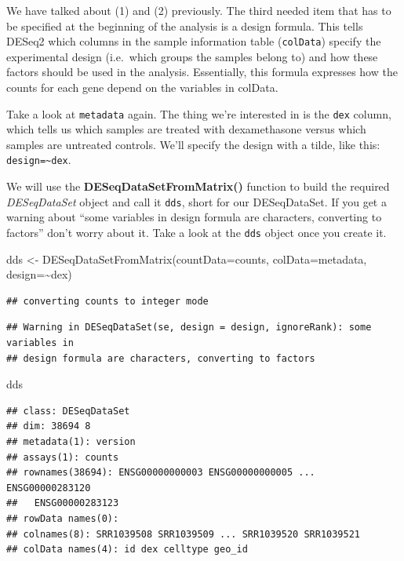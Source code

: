 \documentclass[
]{article}
\newenvironment{Shaded}{\begin{snugshade}}{\end{snugshade}}
\newcommand{\AttributeTok}[1]{\textcolor[rgb]{0.77,0.63,0.00}{#1}}
\newcommand{\FunctionTok}[1]{\textcolor[rgb]{0.00,0.00,0.00}{#1}}
\newcommand{\NormalTok}[1]{#1}
\newcommand{\OtherTok}[1]{\textcolor[rgb]{0.56,0.35,0.01}{#1}}
\newcommand{\SpecialCharTok}[1]{\textcolor[rgb]{0.00,0.00,0.00}{#1}}
\begin{document}
We have talked about (1) and (2) previously. The third needed item that
has to be specified at the beginning of the analysis is a design
formula. This tells DESeq2 which columns in the sample information table
(\texttt{colData}) specify the experimental design (i.e.~which groups
the samples belong to) and how these factors should be used in the
analysis. Essentially, this formula expresses how the counts for each
gene depend on the variables in colData.

Take a look at \texttt{metadata} again. The thing we're interested in is
the \texttt{dex} column, which tells us which samples are treated with
dexamethasone versus which samples are untreated controls. We'll specify
the design with a tilde, like this:
\texttt{design=\textasciitilde{}dex}.

We will use the \textbf{DESeqDataSetFromMatrix()} function to build the
required \emph{DESeqDataSet} object and call it \texttt{dds}, short for
our DESeqDataSet. If you get a warning about ``some variables in design
formula are characters, converting to factors'' don't worry about it.
Take a look at the \texttt{dds} object once you create it.

\begin{Shaded}
\begin{Highlighting}[]
\NormalTok{dds }\OtherTok{\textless{}{-}} \FunctionTok{DESeqDataSetFromMatrix}\NormalTok{(}\AttributeTok{countData=}\NormalTok{counts, }
                              \AttributeTok{colData=}\NormalTok{metadata, }
                              \AttributeTok{design=}\SpecialCharTok{\textasciitilde{}}\NormalTok{dex)}
\end{Highlighting}
\end{Shaded}

\begin{verbatim}
## converting counts to integer mode
\end{verbatim}

\begin{verbatim}
## Warning in DESeqDataSet(se, design = design, ignoreRank): some variables in
## design formula are characters, converting to factors
\end{verbatim}

\begin{Shaded}
\begin{Highlighting}[]
\NormalTok{dds}
\end{Highlighting}
\end{Shaded}

\begin{verbatim}
## class: DESeqDataSet 
## dim: 38694 8 
## metadata(1): version
## assays(1): counts
## rownames(38694): ENSG00000000003 ENSG00000000005 ... ENSG00000283120
##   ENSG00000283123
## rowData names(0):
## colnames(8): SRR1039508 SRR1039509 ... SRR1039520 SRR1039521
## colData names(4): id dex celltype geo_id
\end{verbatim}
\end{document}
